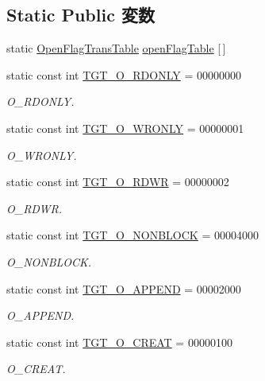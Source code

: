 \subsection*{Static Public 変数}
\begin{DoxyCompactItemize}
\item 
static \hyperlink{structOpenFlagTransTable}{OpenFlagTransTable} \hyperlink{classX86Linux32_ab1db5a531609b99b262cc849ea24765a}{openFlagTable} \mbox{[}$\,$\mbox{]}
\item 
static const int \hyperlink{classX86Linux32_ad266b23a0ae07d1833e18bae651f3411}{TGT\_\-O\_\-RDONLY} = 00000000
\begin{DoxyCompactList}\small\item\em O\_\-RDONLY. \item\end{DoxyCompactList}\item 
static const int \hyperlink{classX86Linux32_a6156c069cefe05ce3cce033b2e0c2de2}{TGT\_\-O\_\-WRONLY} = 00000001
\begin{DoxyCompactList}\small\item\em O\_\-WRONLY. \item\end{DoxyCompactList}\item 
static const int \hyperlink{classX86Linux32_ac6fa9ecf5d2f3314f197698f1099e2ac}{TGT\_\-O\_\-RDWR} = 00000002
\begin{DoxyCompactList}\small\item\em O\_\-RDWR. \item\end{DoxyCompactList}\item 
static const int \hyperlink{classX86Linux32_a0ea5420b4c9b45ba342a266fb77ac942}{TGT\_\-O\_\-NONBLOCK} = 00004000
\begin{DoxyCompactList}\small\item\em O\_\-NONBLOCK. \item\end{DoxyCompactList}\item 
static const int \hyperlink{classX86Linux32_af11adc5404ea3780a5ce2829cc3710b7}{TGT\_\-O\_\-APPEND} = 00002000
\begin{DoxyCompactList}\small\item\em O\_\-APPEND. \item\end{DoxyCompactList}\item 
static const int \hyperlink{classX86Linux32_aec02e04ca367e6c3f4b46e4edc12efac}{TGT\_\-O\_\-CREAT} = 00000100
\begin{DoxyCompactList}\small\item\em O\_\-CREAT. \item\end{DoxyCompactList}\item 

\end{DoxyCompactItemize}

